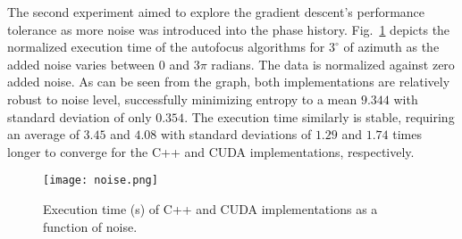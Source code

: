 The second experiment aimed to explore the gradient descent's performance
tolerance as more noise was introduced into the phase history.
Fig.~\ref{fig:noise} depicts the normalized execution time of the
autofocus algorithms for $3^{\circ}$ of azimuth as the added noise varies
between $0$ and $3\pi$ radians. The data is normalized against zero added noise.
As can be seen from the graph, both implementations are relatively robust to
noise level, successfully minimizing entropy to a mean $9.344$ with standard
deviation of only $0.354$. The execution time similarly is stable, requiring an
average of $3.45$ and $4.08$ with standard deviations of $1.29$ and $1.74$ times
longer to converge for the C++ and CUDA implementations, respectively.

\begin{figure}
  \centering
  \texttt{[image: noise.png]}
  \vspace{5 mm}
  \caption{Execution time (s) of C++ and CUDA implementations as a function of
  noise.}
  \label{fig:noise}
\end{figure}
